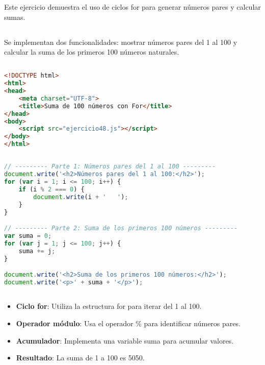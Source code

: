 \documentclass[10pt,a4paper]{article}
\begin{document}
\pagebreak

\section{\color{colorIPN}{Ejercicio 48: Ciclos For}}
Este ejercicio demuestra el uso de ciclos for para generar números pares y calcular sumas.

\subsection{\color{colorESCOM}{Descripción del Problema}}
Se implementan dos funcionalidades: mostrar números pares del 1 al 100 y calcular la suma de los primeros 100 números naturales.

\subsection{\color{colorESCOM}{Código HTML}}
\begin{lstlisting}[language=HTML]
<!DOCTYPE html>
<html>
<head>
    <meta charset="UTF-8"> 
    <title>Suma de 100 números con For</title>
</head>
<body>
    <script src="ejercicio48.js"></script>
</body>
</html>
\end{lstlisting}

\subsection{\color{colorESCOM}{Código JavaScript}}
\begin{lstlisting}[language=JavaScript]
// --------- Parte 1: Números pares del 1 al 100 ---------
document.write('<h2>Números pares del 1 al 100:</h2>');
for (var i = 1; i <= 100; i++) {
    if (i % 2 === 0) {
        document.write(i + '   ');
    }
}

// --------- Parte 2: Suma de los primeros 100 números ---------
var suma = 0;
for (var j = 1; j <= 100; j++) {
    suma += j;
}

document.write('<h2>Suma de los primeros 100 números:</h2>');
document.write('<p>' + suma + '</p>');
\end{lstlisting}

\subsection{\color{colorESCOM}{Análisis del Algoritmo}}
\begin{itemize}
	\item \textbf{Ciclo for}: Utiliza la estructura for para iterar del 1 al 100.
	\item \textbf{Operador módulo}: Usa el operador \% para identificar números pares.
	\item \textbf{Acumulador}: Implementa una variable suma para acumular valores.
	\item \textbf{Resultado}: La suma de 1 a 100 es 5050.
\end{itemize}
\end{document}
